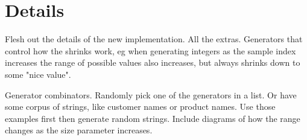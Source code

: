 \section{Details}

Flesh out the details of the new implementation. All the extras. Generators that control how the shrinks work, eg when generating integers as the sample index increases the range of possible values also increases, but always shrinks down to some "nice value".

Generator combinators. Randomly pick one of the generators in a list. Or have some corpus of strings, like customer names or product names. Use those examples first then generate random strings. Include diagrams of how the range changes as the size parameter increases.
